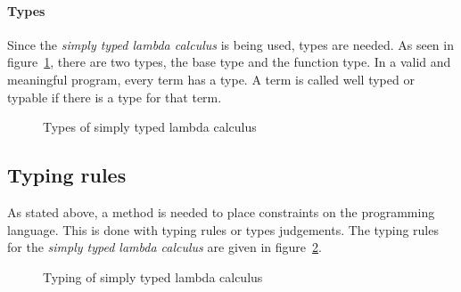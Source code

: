 \paragraph{Types}
Since the \textit{simply typed lambda calculus} is being used, types are needed. As seen in figure~\ref{fig:types:lambda}, there are two types, the base type and the function type. In a valid and meaningful program, every term has a type. A term is called well typed or typable if there is a type for that term. 

\begin{figure}[!htb]
\begin{center}
\end{center}
\caption{Types of simply typed lambda calculus}\label{fig:types:lambda}
\end{figure}

\subsection{Typing rules}

As stated above, a method is needed to place constraints on the programming language. This is done with typing rules or types judgements. The typing rules for the \textit{simply typed lambda calculus} are given in figure~\ref{fig:lambda-typing}. 

\begin{figure}[!htb]
\begin{center}
\end{center}
\caption{Typing of simply typed lambda calculus}\label{fig:lambda-typing}
\end{figure}

